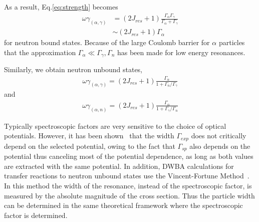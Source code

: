 As a result, Eq.\ref{eq:strength} becomes
 \begin{equation}
    \label{eq:width_n_bound}
    \begin{aligned}
 \omega \gamma_{(\alpha,\gamma)} &= (2J_{res} + 1) \frac{\Gamma_\alpha \Gamma_\gamma }{\Gamma_\alpha + \Gamma_\gamma } \\
                                & \sim (2J_{res} + 1)\Gamma_\alpha
        \end{aligned}
\end{equation}
for neutron bound states. Because of the large Coulomb barrier for $\alpha$ particles that the approximation $\Gamma_\alpha \ll \Gamma_\gamma , \Gamma_n$ has been made for low energy resonances.


Similarly, we obtain neutron unbound states,
\begin{equation}
    \label{eq:width_n_unbound1}
    \begin{aligned}
 \omega \gamma_{(\alpha,\gamma)} = (2J_{res} + 1) \frac{\Gamma_\alpha }{1+ \Gamma_n/\Gamma_\gamma }
        \end{aligned}
\end{equation}
and
\begin{equation}
    \label{eq:width_n_unbound2}
    \begin{aligned}
 \omega \gamma_{(\alpha,n)} = (2J_{res} + 1) \frac{\Gamma_\alpha }{1+ \Gamma_\gamma/\Gamma_n }
        \end{aligned}
\end{equation}



Typically spectroscopic factors  are very sensitive to the choice of optical potentials. However, it has been  shown~\citep{Fortune2003} that the width $\Gamma_{exp}$ does not critically depend on the selected potential, owing to  the fact that $\Gamma_{sp}$ also depends on the potential thus canceling most of the potential dependence, as long as both values are extracted with the same potential. In addition, DWBA calculations for transfer reactions to neutron unbound states use the Vincent-Fortune Method~\citep{Vincent1970}. In this method the width of the resonance, instead of the spectroscopic factor, is measured by the absolute magnitude of the cross section. Thus the particle width can be determined in the same theoretical framework where the spectroscopic factor is determined.




